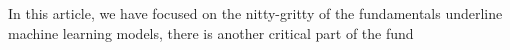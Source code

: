 In this article, we have focused on the nitty-gritty of the fundamentals underline machine learning models, there is another critical part of the fund